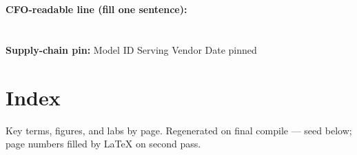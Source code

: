 \begin{tcolorbox}[colback=white,colframe=checkblack,title=ENGAGEMENT — Target to Published Method,sharp corners,boxrule=1pt,breakable]
\vspace{6pt}

\vspace{6pt}
\noindent\textbf{CFO-readable line (fill one sentence):}\\
\hrulefill \\
\hrulefill \\

\vspace{4pt}
\noindent\textbf{Supply-chain pin:} Model ID \hrulefill \quad Serving \hrulefill \quad Vendor \hrulefill \quad Date pinned \hrulefill

\end{tcolorbox}

\newpage
\chapter*{Index}
{\small Key terms, figures, and labs by page. Regenerated on final compile — seed below; page numbers filled by LaTeX on second pass.}

